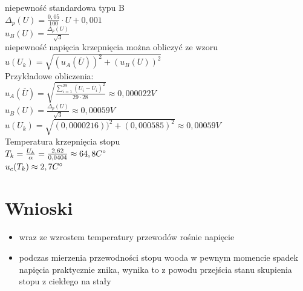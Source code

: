 \documentclass{article}
\begin{document}
niepewność standardowa typu B\\
$\Delta_{p}(U)=\frac{0,05}{100}\cdot U+0,001$\\

$u_{B}(U)=\frac{\Delta_{p}(U)}{\sqrt{3}}$\\

niepewność napięcia krzepnięcia można obliczyć ze wzoru\\
$u(U_{k})=\sqrt{(u_{A}(\overline{U}))^2+(u_{B}(U))^2}$\\

Przykładowe obliczenia:\\
$u_{A}(\overline{U})=\sqrt{\frac{\sum_{i=1}^{29}(U_{i}-\overline{U}_{i})^2}{29\cdot28}}\approx0,000022V$\\

$u_{B}(U)=\frac{\Delta_{p}(U)}{\sqrt{3}}\approx0,00059V$\\

$u(U_{k})=\sqrt{(0,0000216))^2+(0,000585)^2}\approx0,00059V$\\

Temperatura krzepnięcia stopu\\
$T_{k}=\frac{U_{k}}{\alpha}=\frac{2,62}{0,0404}\approx64,8C\degree$\\

$u_{c}(T_{k})\approx2,7C\degree$\\
\section{Wnioski}
\begin{itemize}
    \item wraz ze wzrostem temperatury przewodów rośnie napięcie
    \item podczas mierzenia przewodności stopu wooda w pewnym momencie spadek napięcia praktycznie znika, wynika to z powodu przejścia stanu skupienia stopu z ciekłego na stały
\end{itemize}
\end{document}
